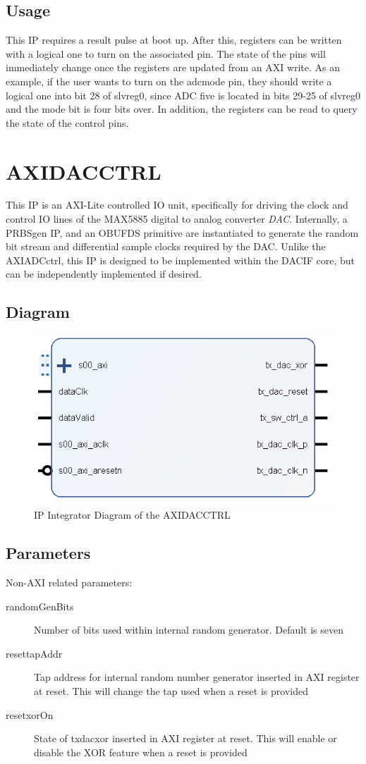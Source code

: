 \documentclass[11pt]{article}
\begin{document}
\subsection{Usage}
This IP requires a result pulse at boot up. After this, registers can be written with a logical one to turn on the associated pin. The state of the pins
will immediately change once the registers are updated from an AXI write.\hfill\break
As an example, if the user wants to turn on the adc\textunderscore mode pin, they should write a logical one into bit 28 of
slv\textunderscore reg0, since ADC five is located in bits 29-25 of slv\textunderscore reg0 and the mode bit is four bits over.\hfill\break
In addition, the registers can be read to query the state of the control pins.

\section{AXI\textunderscore DAC\textunderscore CTRL}
This IP is an AXI-Lite controlled IO unit, specifically for driving the clock and control IO lines of the MAX5885 digital to analog converter
\textit{DAC}.
Internally, a PRBS\textunderscore gen IP, and an OBUFDS primitive are instantiated to generate the random bit stream and differential sample clocks
required by the DAC. Unlike the AXI\textunderscore ADC\textunderscore ctrl, this IP is designed to be implemented within the DAC\textunderscore IF
\textunderscore core, but can be independently implemented if desired.
\subsection{Diagram}
\begin{figure}[H]
	\centering
	\includegraphics[width=0.42\linewidth]{images/AXI_DAC_CTRL}
	\caption{IP Integrator Diagram of the AXI\textunderscore DAC\textunderscore CTRL}
\end{figure}
\subsection{Parameters}
Non-AXI related parameters:
\begin{description}
	\item[randomGenBits]Number of bits used within internal random generator. Default is seven
	\item[reset\textunderscore tapAddr]Tap address for internal random number generator inserted in AXI register at reset. This will change the tap
		used when a reset is provided
	\item[reset\textunderscore xorOn]State of tx\textunderscore dac\textunderscore xor inserted in AXI register at reset. This will enable or disable the
		XOR feature when a reset is provided
\end{description}
\end{document}
